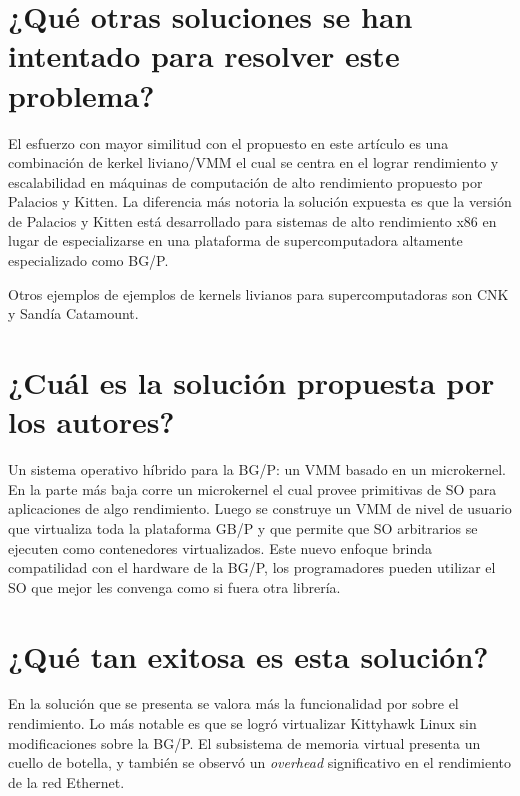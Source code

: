 \section{¿Qué otras soluciones se han intentado para resolver este problema?}
El esfuerzo con mayor similitud con el propuesto en este artículo es una combinación de kerkel liviano/VMM el cual se centra en el lograr rendimiento y escalabilidad en máquinas de computación de alto rendimiento propuesto por Palacios y Kitten. La diferencia más notoria la solución expuesta es que la versión de Palacios y Kitten está desarrollado para sistemas de alto rendimiento x86 en lugar de especializarse en una plataforma de supercomputadora altamente especializado como BG/P.

Otros ejemplos de ejemplos de kernels livianos para supercomputadoras son CNK y Sandía Catamount.
     
\section{¿Cuál es la solución propuesta por los autores?}
Un sistema operativo híbrido para la BG/P: un VMM basado en un microkernel. En la parte más baja corre un microkernel el cual provee primitivas de SO para aplicaciones de algo rendimiento. Luego se construye un VMM de nivel de usuario que virtualiza toda la plataforma GB/P y que permite que SO arbitrarios se ejecuten como contenedores virtualizados. Este nuevo enfoque brinda compatilidad con el hardware de la BG/P, los programadores pueden utilizar el SO que mejor les convenga como si fuera otra librería. 

\section{¿Qué tan exitosa es esta solución?} 
En la solución que se presenta se valora más la funcionalidad por sobre el rendimiento. Lo más notable es que se logró virtualizar Kittyhawk Linux sin modificaciones sobre la BG/P. El subsistema de memoria virtual presenta un cuello de botella, y también se observó un \emph{overhead} significativo en el rendimiento de la red Ethernet.






















